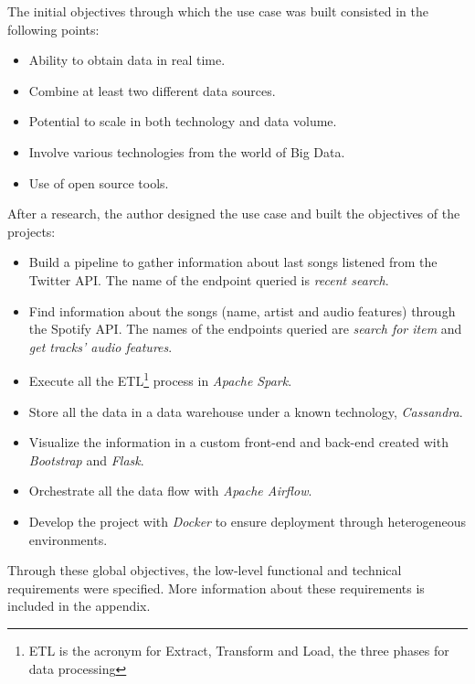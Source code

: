 

\nonzeroparskip The initial objectives through which the use case was built consisted in the following points:
\begin{itemize}
	\item Ability to obtain data in real time.
	\item Combine at least two different data sources.
	\item Potential to scale in both technology and data volume.
	\item Involve various technologies from the world of Big Data.
	\item Use of open source tools.
\end{itemize}

\nonzeroparskip After a research, the author designed the use case and built the objectives of the projects:
\begin{itemize}
	\item Build a pipeline to gather information about last songs listened from the Twitter API. The name of the endpoint queried is \textit{recent search}.
	\item Find information about the songs (name, artist and audio features) through the Spotify API. The names of the endpoints queried are \textit{search for item} and \textit{get tracks' audio features}.
	\item Execute all the ETL\footnote{ETL is the acronym for Extract, Transform and Load, the three phases for data processing} process in \textit{Apache Spark}.
	\item Store all the data in a data warehouse under a known technology, \textit{Cassandra}.
	\item Visualize the information in a custom front-end and back-end created with \textit{Bootstrap} and \textit{Flask}.
	\item Orchestrate all the data flow with \textit{Apache Airflow}.
	\item Develop the project with \textit{Docker} to ensure deployment through heterogeneous environments.
\end{itemize}

\nonzeroparskip Through these global objectives, the low-level functional and technical requirements were specified. More information about these requirements is included in the appendix.